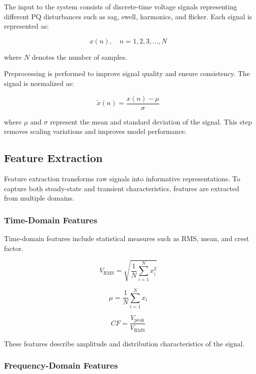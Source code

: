\documentclass[conference]{IEEEtran}
\begin{document}
The input to the system consists of discrete-time voltage signals representing different PQ disturbances such as sag, swell, harmonics, and flicker. Each signal is represented as:

\begin{equation}
x(n), \quad n = 1,2,3,...,N
\end{equation}

where $N$ denotes the number of samples.

Preprocessing is performed to improve signal quality and ensure consistency. The signal is normalized as:

\begin{equation}
\tilde{x}(n) = \frac{x(n) - \mu}{\sigma}
\end{equation}

where $\mu$ and $\sigma$ represent the mean and standard deviation of the signal. This step removes scaling variations and improves model performance.

\subsection{Feature Extraction}

Feature extraction transforms raw signals into informative representations. To capture both steady-state and transient characteristics, features are extracted from multiple domains.

\subsubsection{Time-Domain Features}

Time-domain features include statistical measures such as RMS, mean, and crest factor.

\begin{equation}
V_{\text{RMS}} = \sqrt{\frac{1}{N} \sum_{i=1}^{N} x_i^2}
\end{equation}

\begin{equation}
\mu = \frac{1}{N} \sum_{i=1}^{N} x_i
\end{equation}

\begin{equation}
CF = \frac{V_{\text{peak}}}{V_{\text{RMS}}}
\end{equation}

These features describe amplitude and distribution characteristics of the signal.

\subsubsection{Frequency-Domain Features}
\end{document}
